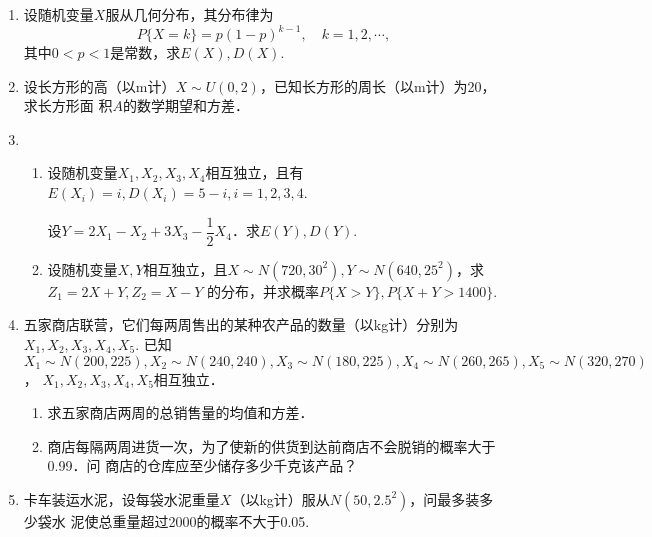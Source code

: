 \documentclass[10pt,a4paper]{article}
\begin{document}
\begin{enumerate}
    \item 设随机变量$X$服从几何分布，其分布律为
    $$P\{X=k\}=p(1-p)^{k-1},\quad k=1,2,\cdots,$$
    其中$0<p<1$是常数，求$E(X),D(X)$.
    \vspace{8cm}


    \item 设长方形的高（以m计）$X\sim U(0,2)$，已知长方形的周长（以m计）为20，求长方形面
    积$A$的数学期望和方差．
    \vspace{10cm}



    \item \begin{enumerate}
        \item 设随机变量$X_1,X_2,X_3,X_4$相互独立，且有$E(X_i)=i,D(X_i)=5-i,i=1,2,3,4$.
        \vspace{-0.2cm}
        \begin{spacing}{2.0}
        设$Y=2X_1-X_2+3X_3-\dfrac{1}{2}X_4$．求$E(Y),D(Y)$.
        \end{spacing}
        \vspace{-0.2cm}
    \item 设随机变量$X,Y$相互独立，且$X\sim N(720,30^2),Y\sim N(640,25^2)$，求$Z_1=2X+Y,Z_2=X-Y$
    的分布，并求概率$P\{X>Y\},P\{X+Y>1400\}$.
    \end{enumerate}
    \vspace{11cm}



    \item 五家商店联营，它们每两周售出的某种农产品的数量（以kg计）分别为$X_1,X_2,X_3,X_4,X_5$.
    已知$X_1\sim N(200,225),X_2\sim N(240,240),X_3\sim N(180,225),X_4\sim N(260,265),X_5\sim N(320,270)$，
    $X_1,X_2,X_3,X_4,X_5$相互独立．
    \begin{enumerate}
        \item 求五家商店两周的总销售量的均值和方差．
        \item 商店每隔两周进货一次，为了使新的供货到达前商店不会脱销的概率大于0.99．问
        商店的仓库应至少储存多少千克该产品？
    \end{enumerate}
    \vspace{10cm}



    \item 卡车装运水泥，设每袋水泥重量$X$（以kg计）服从$N(50,2.5^2)$，问最多装多少袋水
    泥使总重量超过2000的概率不大于0.05.
    \vspace{10cm}





\end{enumerate}
\end{document}
